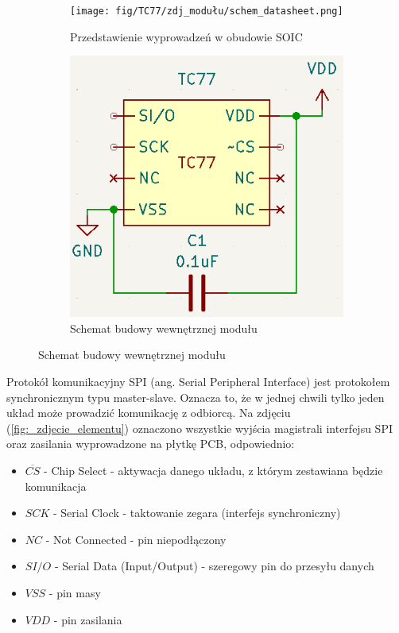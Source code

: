 \documentclass[11pt, a4paper]{article}
\begin{document}
\begin{figure}[h]
\centering
\begin{subfigure}{.5\textwidth}
\centering
\texttt{[image: fig/TC77/zdj\_modułu/schem\_datasheet.png]}
\caption{Przedstawienie wyprowadzeń w obudowie SOIC \cite{microchip:TC77}}
\label{fig:_zdjecie_modulu}
\end{subfigure}%
\begin{subfigure}{.5\textwidth}
\centering
\includegraphics[width=.55\linewidth]{fig/TC77/polaczenie_modulu/schemat_kicad.png}
\caption{Schemat budowy wewnętrznej modułu}
\label{fig:_schemat_modulu}
\end{subfigure}
\label{fig:modul}
\end{figure}
\vspace{0.25cm}

Protokół komunikacyjny SPI (ang. Serial Peripheral Interface) jest protokołem synchronicznym typu master-slave. Oznacza to, że w jednej chwili tylko jeden układ może prowadzić komunikację z odbiorcą. Na zdjęciu (\ref{fig:_zdjecie_elementu}) oznaczono wszystkie wyjścia magistrali interfejsu SPI oraz zasilania wyprowadzone na płytkę PCB, odpowiednio: 
\begin{itemize}
  \item $\overline{CS}$ - Chip Select - aktywacja danego układu, z którym zestawiana będzie komunikacja
  \item $SCK$ - Serial Clock - taktowanie zegara (interfejs synchroniczny)
  \item $NC$ - Not Connected - pin niepodłączony
  \item $SI/O$ - Serial Data (Input/Output) - szeregowy pin do przesyłu danych
  \item $VSS$ - pin masy
  \item $VDD$ - pin zasilania
\end{itemize}
\end{document}
